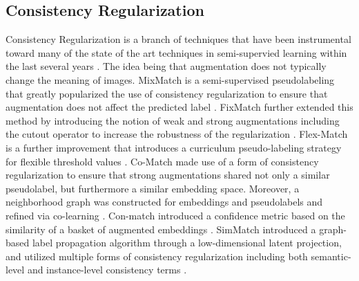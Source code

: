 \documentclass[10pt,twocolumn,letterpaper]{article}
\begin{document}
\subsection{Consistency Regularization}

Consistency Regularization is a branch of techniques that have been instrumental toward many of the state of the art techniques in semi-supervied learning within the last several years \cite{berthelot2019mixmatch, berthelot2019remixmatch, sohn2020fixmatch, zhang2021flexmatch, li2021comatch, kim2022conmatch, zheng2022simmatch, zheng2023simmatchv2}.  The idea being that augmentation does not typically change the meaning of images.  MixMatch is a semi-supervised pseudolabeling that greatly popularized the use of consistency regularization to ensure that augmentation does not affect the predicted label \cite{berthelot2019mixmatch, berthelot2019remixmatch}.  FixMatch further extended this method by introducing the notion of weak and strong augmentations including the cutout operator to increase the robustness of the regularization \cite{sohn2020fixmatch}.  Flex-Match is a further improvement that introduces a curriculum pseudo-labeling strategy for flexible threshold values \cite{zhang2021flexmatch}.  Co-Match made use of a form of consistency regularization to ensure that strong augmentations shared not only a similar pseudolabel, but furthermore a similar embedding space.  Moreover, a neighborhood graph was constructed for embeddings and pseudolabels and refined via co-learning \cite{li2021comatch}.  Con-match introduced a confidence metric based on the similarity of a basket of augmented embeddings \cite{kim2022conmatch}.  SimMatch introduced a graph-based label propagation algorithm through a low-dimensional latent projection, and utilized multiple forms of consistency regularization including both semantic-level and instance-level consistency terms \cite{zheng2022simmatch, zheng2023simmatchv2}.  

\end{document}
